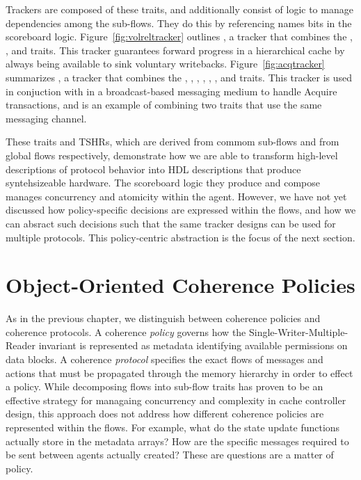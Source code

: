 Trackers are composed of these traits, and additionally consist of logic to manage dependencies among the sub-flows.
They do this by referencing names bits in the scoreboard logic.
Figure~\ref{fig:volreltracker} outlines , a tracker that combines the
, , and  traits.
This tracker guarantees forward progress in a hierarchical cache by always being available to sink voluntary writebacks.
Figure~\ref{fig:acqtracker} summarizes , a tracker that combines the
, , 
, , , ,
and  traits.
This tracker is used in conjuction with in a broadcast-based messaging medium to handle Acquire transactions,
and is an example of combining two traits that use the same messaging channel.

These traits and TSHRs, which are derived from commom sub-flows and from global flows respectively,
demonstrate how we are able to transform high-level descriptions of protocol behavior into HDL descriptions
that produce syntehsizeable hardware.
The scoreboard logic they produce and compose manages concurrency and atomicity within the agent.
However, we have not yet discussed how policy-specific decisions are expressed within the flows,
and how we can absract such decisions such that the same tracker designs can be used for multiple protocols.
This policy-centric abstraction is the focus of the next section.

\section{Object-Oriented Coherence Policies}

As in the previous chapter, we distinguish between coherence policies and coherence protocols.
A coherence {\em policy} governs how the Single-Writer-Multiple-Reader invariant is represented as metadata identifying available permissions on data blocks.
A coherence {\em protocol} specifies the exact flows of messages and actions that must be propagated through the memory hierarchy in order to effect a policy.
While decomposing flows into sub-flow traits has proven to be an effective strategy for managaing concurrency and complexity in cache controller design,
this approach does not address how different coherence policies are represented within the flows.
For example, what do the state update functions actually store in the metadata arrays?
How are the specific messages required to be sent between agents actually created?
These are questions are a matter of policy.

